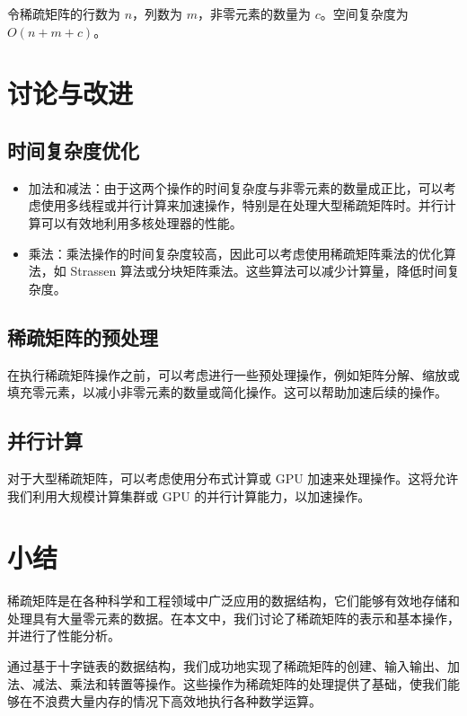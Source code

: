 \documentclass[12pt]{article}
\begin{document}
令稀疏矩阵的行数为 $n$，列数为 $m$，非零元素的数量为 $c$。空间复杂度为 $O(n+m+c)$。

\section{讨论与改进}

\subsection{时间复杂度优化}

\begin{itemize}
\item 加法和减法：由于这两个操作的时间复杂度与非零元素的数量成正比，可以考虑使用多线程或并行计算来加速操作，特别是在处理大型稀疏矩阵时。并行计算可以有效地利用多核处理器的性能。
\item 乘法：乘法操作的时间复杂度较高，因此可以考虑使用稀疏矩阵乘法的优化算法，如 Strassen 算法或分块矩阵乘法。这些算法可以减少计算量，降低时间复杂度。
\end{itemize}

\subsection{稀疏矩阵的预处理}

在执行稀疏矩阵操作之前，可以考虑进行一些预处理操作，例如矩阵分解、缩放或填充零元素，以减小非零元素的数量或简化操作。这可以帮助加速后续的操作。

\subsection{并行计算}

对于大型稀疏矩阵，可以考虑使用分布式计算或 GPU 加速来处理操作。这将允许我们利用大规模计算集群或 GPU 的并行计算能力，以加速操作。

\newpage

\section{小结}

稀疏矩阵是在各种科学和工程领域中广泛应用的数据结构，它们能够有效地存储和处理具有大量零元素的数据。在本文中，我们讨论了稀疏矩阵的表示和基本操作，并进行了性能分析。

通过基于十字链表的数据结构，我们成功地实现了稀疏矩阵的创建、输入输出、加法、减法、乘法和转置等操作。这些操作为稀疏矩阵的处理提供了基础，使我们能够在不浪费大量内存的情况下高效地执行各种数学运算。
\end{document}
